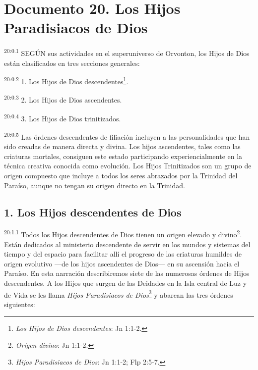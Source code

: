 \chapter{Documento 20. Los Hijos Paradisiacos de Dios}
\par
\textsuperscript{20:0.1} SEGÚN sus actividades en el superuniverso de Orvonton, los Hijos de Dios están clasificados en tres secciones generales:

\par
\textsuperscript{20:0.2} 1. Los Hijos de Dios descendentes\footnote{\textit{Los Hijos de Dios descendentes}: Jn 1:1-2.}.

\par
\textsuperscript{20:0.3} 2. Los Hijos de Dios ascendentes.

\par
\textsuperscript{20:0.4} 3. Los Hijos de Dios trinitizados.

\par
\textsuperscript{20:0.5} Las órdenes descendentes de filiación incluyen a las personalidades que han sido creadas de manera directa y divina. Los hijos ascendentes, tales como las criaturas mortales, consiguen este estado participando experiencialmente en la técnica creativa conocida como evolución. Los Hijos Trinitizados son un grupo de origen compuesto que incluye a todos los seres abrazados por la Trinidad del Paraíso, aunque no tengan su origen directo en la Trinidad.

\section*{1. Los Hijos descendentes de Dios}
\par
\textsuperscript{20:1.1} Todos los Hijos descendentes de Dios tienen un origen elevado y divino\footnote{\textit{Origen divino}: Jn 1:1-2.}. Están dedicados al ministerio descendente de servir en los mundos y sistemas del tiempo y del espacio para facilitar allí el progreso de las criaturas humildes de origen evolutivo ---de los hijos ascendentes de Dios--- en su ascensión hacia el Paraíso. En esta narración describiremos siete de las numerosas órdenes de Hijos descendentes. A los Hijos que surgen de las Deidades en la Isla central de Luz y de Vida se les llama \textit{Hijos Paradisiacos de Dios}\footnote{\textit{Hijos Paradisiacos de Dios}: Jn 1:1-2; Flp 2:5-7.} y abarcan las tres órdenes siguientes:

